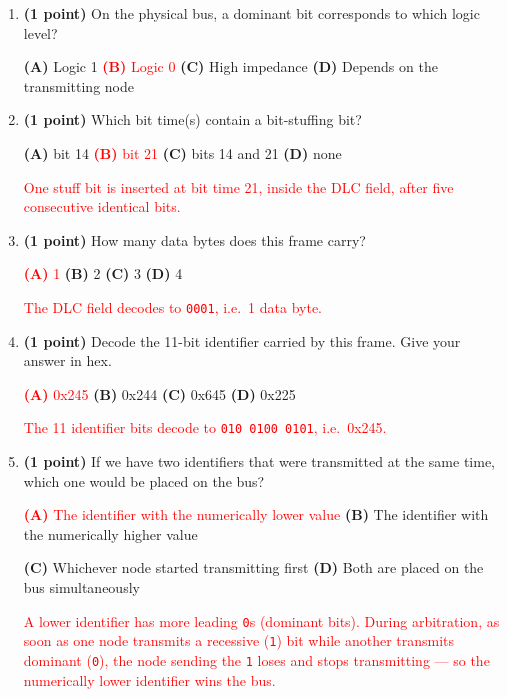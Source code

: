 \documentclass[10pt]{article}
\newcommand{\sol}[1]{\textcolor{red}{#1}}
\begin{document}
\begin{enumerate}[label=\textbf{\arabic*.}, leftmargin=*, itemsep=8pt]
\begin{enumerate}[label=(\alph*), leftmargin=*, itemsep=6pt]
\item \textbf{(1 point)} On the physical bus, a dominant bit corresponds to which logic level?

\centerline{\textbf{(A)} Logic 1 \qquad \sol{\textbf{(B)} Logic 0} \qquad \textbf{(C)} High impedance \qquad \textbf{(D)} Depends on the transmitting node}

\item \textbf{(1 point)} Which bit time(s) contain a bit-stuffing bit?

\centerline{\textbf{(A)} bit 14 \qquad \sol{\textbf{(B)} bit 21} \qquad \textbf{(C)} bits 14 and 21 \qquad \textbf{(D)} none}
\sol{One stuff bit is inserted at bit time 21, inside the DLC field, after five consecutive identical bits.}

\item \textbf{(1 point)} How many data bytes does this frame carry?

\centerline{\sol{\textbf{(A)} 1} \qquad \textbf{(B)} 2 \qquad \textbf{(C)} 3 \qquad \textbf{(D)} 4}
\sol{The DLC field decodes to \texttt{0001}, i.e.\ 1 data byte.}

\item \textbf{(1 point)} Decode the 11-bit identifier carried by this frame. Give your answer in hex.

\centerline{\sol{\textbf{(A)} 0x245} \qquad \textbf{(B)} 0x244 \qquad \textbf{(C)} 0x645 \qquad \textbf{(D)} 0x225}
\sol{The 11 identifier bits decode to \texttt{010 0100 0101}, i.e.\ 0x245.}

\item \textbf{(1 point)} If we have two identifiers that were transmitted at the same time, which one would be placed on the bus?

\centerline{\sol{\textbf{(A)} The identifier with the numerically lower value} \qquad \textbf{(B)} The identifier with the numerically higher value}
\centerline{\textbf{(C)} Whichever node started transmitting first \qquad \textbf{(D)} Both are placed on the bus simultaneously}
\sol{A lower identifier has more leading \texttt{0}s (dominant bits). During arbitration, as soon as one node transmits a recessive (\texttt{1}) bit while another transmits dominant (\texttt{0}), the node sending the \texttt{1} loses and stops transmitting --- so the numerically lower identifier wins the bus.}
\end{enumerate}

\end{enumerate}
\end{document}
